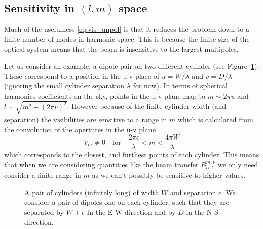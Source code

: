 \documentclass[prd,twocolumn,nofootinbib]{revtex4}
\begin{document}
\subsection{Sensitivity in $(l,m)$ space}

Much of the usefulness \eqref{eq:vis_unpol} is that it reduces the problem down
to a finite number of modes in harmonic space. This is because the finite size
of the optical system means that the beam is insensitive to the largest
multipoles.

Let us consider an example, a dipole pair on two different cylinder (see
Figure~\ref{fig:cylinder}). These correspond to a position in the u-v place of
$u = W / \lambda$ and $v = D / \lambda$ (ignoring the small cylinder separation
$\lambda$ for now). In terms of spherical harmonics coefficients on the sky,
points in the u-v plane map to $m \sim 2\pi u$ and $l \sim \sqrt{m^2 + (2\pi
  v)^2}$. However because of the finite cylinder width (and separation) the
visibilities are sensitive to a range in $m$ which is calculated from the
convolution of the apertures in the u-v plane
\begin{equation}
  V_{m} \ne 0 \quad\text{for}\quad \frac{2 \pi \epsilon}{\lambda} < m < \frac{4 \pi
    W}{\lambda}
\end{equation}
which corresponds to the closest, and furthest points of each cylinder. This
means that when we are considering quantities like the beam transfer
$B_{\alpha,l}^{m,\nu}$ we only need consider a finite range in $m$ as we can't
possibly be sensitive to higher values.

\begin{figure}
\centering
{}
\caption{A pair of cylinders (infintely long) of width $W$ and separation
  $\epsilon$. We consider a pair of dipoles one on each cylinder, such that they
  are separated by $W+\epsilon$ In the E-W direction and by $D$ in the N-S
  direction.}
\label{fig:cylinder}
\end{figure}
\end{document}
